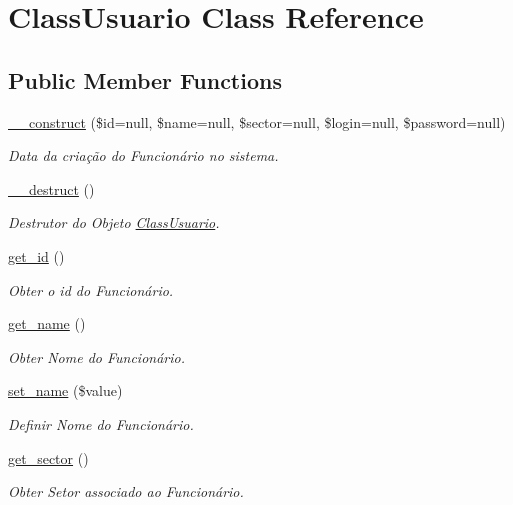 \hypertarget{class_class_usuario}{}\section{Class\+Usuario Class Reference}
\label{class_class_usuario}
\subsection*{Public Member Functions}
\begin{DoxyCompactItemize}
\item 
\hyperlink{class_class_usuario_a45b276efdfbf14af270d51a7b603fa52}{\+\_\+\+\_\+construct} (\$id=null, \$name=null, \$sector=null, \$login=null, \$password=null)
\begin{DoxyCompactList}\small\item\em Data da criação do Funcionário no sistema. \end{DoxyCompactList}\item 
\hyperlink{class_class_usuario_a421831a265621325e1fdd19aace0c758}{\+\_\+\+\_\+destruct} ()
\begin{DoxyCompactList}\small\item\em Destrutor do Objeto \hyperlink{class_class_usuario}{Class\+Usuario}. \end{DoxyCompactList}\item 
\hyperlink{class_class_usuario_a8a94003b9d888b085c68d6eac44be175}{get\+\_\+id} ()
\begin{DoxyCompactList}\small\item\em Obter o id do Funcionário. \end{DoxyCompactList}\item 
\hyperlink{class_class_usuario_a4f1149ccbd69d1ac4225b7bc2dd871bb}{get\+\_\+name} ()
\begin{DoxyCompactList}\small\item\em Obter Nome do Funcionário. \end{DoxyCompactList}\item 
\hyperlink{class_class_usuario_a53e29da8f1da63502f3e13091fcb74e5}{set\+\_\+name} (\$value)
\begin{DoxyCompactList}\small\item\em Definir Nome do Funcionário. \end{DoxyCompactList}\item 
\hyperlink{class_class_usuario_a31b79003e5d3bc648bb381b59f0088bd}{get\+\_\+sector} ()
\begin{DoxyCompactList}\small\item\em Obter Setor associado ao Funcionário. \end{DoxyCompactList}\item 

\end{DoxyCompactItemize}
